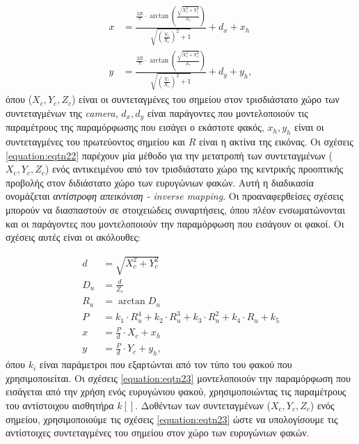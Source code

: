 \begin{subequations}
\label{equation:eqtn22}
\begin{align}
x&=\frac{\frac{2R}{\pi}\cdot \arctan(\frac{\sqrt{X_{c}^{2} + Y_{c}^{2}}}{Z_{c}})}{\sqrt{(\frac{Y_{c}}{X_{c}})^{2} + 1}} + d_{x} + x_{h}\label{equation:eqtn22a}\\
y&=\frac{\frac{2R}{\pi}\cdot \arctan(\frac{\sqrt{X_{c}^{2} + Y_{c}^{2}}}{Z_{c}})}{\sqrt{(\frac{Y_{c}}{X_{c}})^{2} + 1}} + d_{y} + y_{h},\label{equation:eqtn22b}
\end{align}
\end{subequations}
\noindent
όπου (\(X_{c}, Y_{c}, Z_{c}\)) είναι οι συντεταγμένες του σημείου στον τρισδιάστατο χώρο των συντεταγμένων της \textsl{camera}, \(d_{x}, d_{y}\) είναι παράγοντες που μοντελοποιούν τις παραμέτρους της παραμόρφωσης που εισάγει ο εκάστοτε φακός, \(x_{h}, y_{h}\) είναι οι συντεταγμένες του πρωτεύοντος σημείου και \(R\) είναι η ακτίνα της εικόνας. Οι σχέσεις \eqref{equation:eqtn22} παρέχουν μία μέθοδο για την μετατροπή των συντεταγμένων (\(X_{c},Y_{c},Z_{c}\)) ενός αντικειμένου από τον τρισδιάστατο χώρο της κεντρικής προοπτικής προβολής στον διδιάστατο χώρο των ευρυγώνιων φακών. Αυτή η διαδικασία ονομάζεται \textsl{αντίστροφη απεικόνιση - inverse mapping}. Οι προαναφερθείσες σχέσεις μπορούν να διασπαστούν σε στοιχειώδεις συναρτήσεις, όπου πλέον ενσωματώνονται και οι παράγοντες που μοντελοποιούν την παραμόρφωση που εισάγουν οι φακοί. Οι σχέσεις αυτές είναι οι ακόλουθες:

\begin{subequations}
\label{equation:eqtn23}
\begin{align}
d &=\sqrt{X^{2}_{c} + Y^{2}_{c}}\label{equation:eqtn23a}\\
D_{u} &= \frac{d}{Z_{c}}\label{equation:eqtn23b}\\
R_{u} &= \arctan{D_{u}}\label{equation:eqtn23c}\\
P &=k_{1}\cdot R^{4}_{u} + k_{2}\cdot R^{3}_{u} + k_{3}\cdot R^{2}_{u} + k_{4}\cdot R_{u} + k_{5}\label{equation:eqtn23d}\\
x &=\frac{P}{d}\cdot X_{c} + x_{h}\label{equation:eqtn23e}\\
y &= \frac{P}{d}\cdot Y_{c} + y_{h},\label{equation:eqtn23f}
\end{align}
\end{subequations}
\noindent
όπου \(k_{i}\) είναι παράμετροι που εξαρτώνται από τον τύπο του φακού που χρησιμοποιείται. Οι σχέσεις \eqref{equation:eqtn23} μοντελοποιούν την παραμόρφωση που εισάγεται από την χρήση ενός ευρυγώνιου φακού, χρησιμοποιώντας τις παραμέτρους του αντίστοιχου αισθητήρα \(k[]\). Δοθέντων των συντεταγμένων (\(X_{c}, Y_{c}, Z_{c}\)) ενός σημείου, χρησιμοποιούμε τις σχέσεις \eqref{equation:eqtn23} ώστε να υπολογίσουμε τις αντίστοιχες συντεταγμένες του σημείου στον χώρο των ευρυγώνιων φακών.


